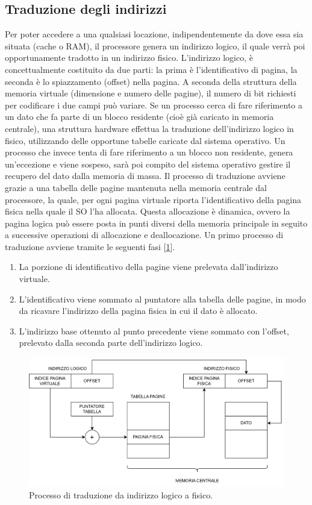 \subsection{Traduzione degli indirizzi}
Per poter accedere a una qualsiasi locazione, indipendentemente da dove essa sia situata (cache o RAM), il processore genera un indirizzo logico, il quale verrà poi opportunamente tradotto in un indirizzo fisico. L'indirizzo logico, è concettualmente costituito da due parti: la prima è l'identificativo di pagina, la seconda è lo spiazzamento (offset) nella pagina. A seconda della struttura della memoria virtuale (dimensione e numero delle pagine), il numero di bit richiesti per codificare i due campi può variare. Se un processo cerca di fare riferimento a un dato che fa parte di un blocco residente (cioè già caricato in memoria centrale), una struttura hardware effettua la traduzione dell'indirizzo logico in fisico, utilizzando delle opportune tabelle caricate dal sistema operativo. Un processo che invece tenta di fare riferimento a un blocco non residente, genera un'eccezione e viene sospeso, sarà poi compito del sistema operativo gestire il recupero del dato dalla memoria di massa. Il processo di traduzione avviene grazie a una tabella delle pagine mantenuta nella memoria centrale dal processore, la quale, per ogni pagina virtuale riporta l'identificativo della pagina fisica nella quale il SO l'ha allocata. Questa allocazione è dinamica, ovvero la pagina logica può essere posta in punti diversi della memoria principale in seguito a successive operazioni di allocazione e deallocazione. Un primo processo di traduzione avviene tramite le seguenti fasi [\ref{fig:traduzione}].
\begin{enumerate}
    \item La porzione di identificativo della pagine viene prelevata dall'indirizzo virtuale.
    \item L'identificativo viene sommato al puntatore alla tabella delle pagine, in modo da ricavare l'indirizzo della pagina fisica in cui il dato è allocato.
    \item L'indirizzo base ottenuto al punto precedente viene sommato con l'offset, prelevato dalla seconda parte dell'indirizzo logico.
\end{enumerate}

\begin{figure}[!h]
    \centering
    \includegraphics[width=0.65\linewidth]{img/traduzione.png}
    \caption{Processo di traduzione da indirizzo logico a fisico.}
    \label{fig:traduzione}
\end{figure}

